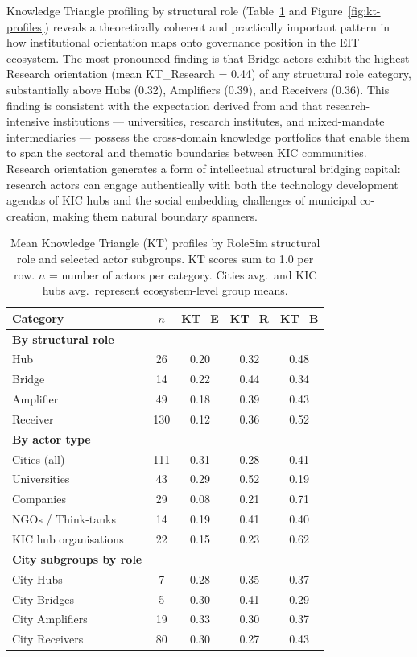 \documentclass[review,12pt]{elsarticle}
\begin{document}
Knowledge Triangle profiling by structural role (Table~\ref{tab:kt-by-role} and Figure~\ref{fig:kt-profiles}) reveals a theoretically coherent and practically important pattern in how institutional orientation maps onto governance position in the EIT ecosystem. The most pronounced finding is that Bridge actors exhibit the highest Research orientation (mean KT\_Research = 0.44) of any structural role category, substantially above Hubs (0.32), Amplifiers (0.39), and Receivers (0.36). This finding is consistent with the expectation derived from \citet{etzkowitz2000dynamics} and \citet{ranga2013triple} that research-intensive institutions --- universities, research institutes, and mixed-mandate intermediaries --- possess the cross-domain knowledge portfolios that enable them to span the sectoral and thematic boundaries between KIC communities. Research orientation generates a form of intellectual structural bridging capital: research actors can engage authentically with both the technology development agendas of KIC hubs and the social embedding challenges of municipal co-creation, making them natural boundary spanners.

\begin{table}[htbp]
\centering
\caption{Mean Knowledge Triangle (KT) profiles by RoleSim structural role and selected actor subgroups. KT scores sum to 1.0 per row. $n$ = number of actors per category. Cities avg.\ and KIC hubs avg.\ represent ecosystem-level group means.}
\label{tab:kt-by-role}
\small
\begin{tabular}{@{}lcccc@{}}
\toprule
\textbf{Category} & \textbf{$n$} & \textbf{KT\_E} & \textbf{KT\_R} & \textbf{KT\_B} \\
\midrule
\textbf{By structural role} & & & & \\
\quad Hub        & 26  & 0.20 & 0.32 & 0.48 \\
\quad Bridge     & 14  & 0.22 & 0.44 & 0.34 \\
\quad Amplifier  & 49  & 0.18 & 0.39 & 0.43 \\
\quad Receiver   & 130 & 0.12 & 0.36 & 0.52 \\
\midrule
\textbf{By actor type} & & & & \\
\quad Cities (all)          & 111 & 0.31 & 0.28 & 0.41 \\
\quad Universities           &  43 & 0.29 & 0.52 & 0.19 \\
\quad Companies              &  29 & 0.08 & 0.21 & 0.71 \\
\quad NGOs / Think-tanks     &  14 & 0.19 & 0.41 & 0.40 \\
\quad KIC hub organisations  &  22 & 0.15 & 0.23 & 0.62 \\
\midrule
\textbf{City subgroups by role} & & & & \\
\quad City Hubs         &  7 & 0.28 & 0.35 & 0.37 \\
\quad City Bridges      &  5 & 0.30 & 0.41 & 0.29 \\
\quad City Amplifiers   & 19 & 0.33 & 0.30 & 0.37 \\
\quad City Receivers    & 80 & 0.30 & 0.27 & 0.43 \\
\bottomrule
\end{tabular}
\end{table}
\end{document}
